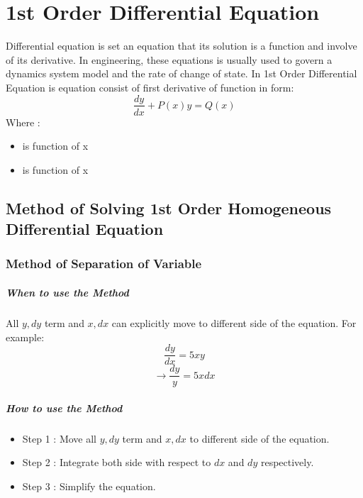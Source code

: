 \chapter{1st Order Differential Equation}
Differential equation is set an equation that its solution is a function and involve of its derivative. In engineering, these equations is usually used to govern a dynamics system model and the rate of change of state. In 1st Order Differential Equation is equation consist of first derivative of function in form:
\[
\frac{dy}{dx} + P(x)y = Q(x)
\]
Where :
\begin{itemize}
	\item { is function of x}
	\item { is function of x}
\end{itemize}

\section{Method of Solving 1st Order Homogeneous Differential Equation}
\subsection{Method of Separation of Variable}
\begin{tcolorbox}[title=Method]
	\paragraph{When to use the Method}
	All ${y,dy}$ term and ${x,dx}$ can explicitly move to different side of the equation. For example:
	\[
	\frac{dy}{dx} = 5xy
	\]
	\[
	\rightarrow \frac{dy}{y} = 5xdx
	\]
	\paragraph{How to use the Method}
	\begin{itemize}
		\item Step 1 : Move all ${y,dy}$ term and ${x,dx}$ to different side of the equation.
		\item Step 2 : Integrate both side with respect to $ dx $ and $ dy $ respectively.
		\item Step 3 : Simplify the equation.
	\end{itemize}
\end{tcolorbox}

